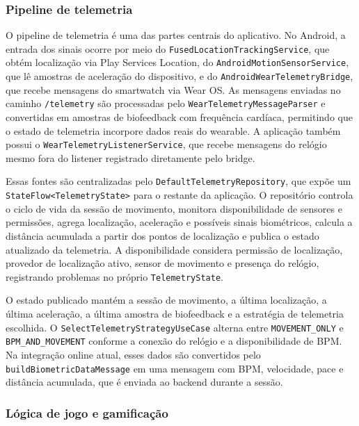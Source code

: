 \vspace{0.2cm}
\subsubsection{Pipeline de telemetria}
\vspace{0.2cm}

O pipeline de telemetria é uma das partes centrais do aplicativo. No Android, a entrada dos sinais ocorre por meio do \texttt{FusedLocationTrackingService}, que obtém localização via Play Services Location, do \texttt{AndroidMotionSensorService}, que lê amostras de aceleração do dispositivo, e do \texttt{AndroidWearTelemetryBridge}, que recebe mensagens do smartwatch via Wear OS. As mensagens enviadas no caminho \texttt{/telemetry} são processadas pelo \texttt{WearTelemetryMessageParser} e convertidas em amostras de biofeedback com frequência cardíaca, permitindo que o estado de telemetria incorpore dados reais do wearable. A aplicação também possui o \texttt{WearTelemetryListenerService}, que recebe mensagens do relógio mesmo fora do listener registrado diretamente pelo bridge.

Essas fontes são centralizadas pelo \texttt{DefaultTelemetryRepository}, que expõe um \texttt{StateFlow<TelemetryState>} para o restante da aplicação. O repositório controla o ciclo de vida da sessão de movimento, monitora disponibilidade de sensores e permissões, agrega localização, aceleração e possíveis sinais biométricos, calcula a distância acumulada a partir dos pontos de localização e publica o estado atualizado da telemetria. A disponibilidade considera permissão de localização, provedor de localização ativo, sensor de movimento e presença do relógio, registrando problemas no próprio \texttt{TelemetryState}.

O estado publicado mantém a sessão de movimento, a última localização, a última aceleração, a última amostra de biofeedback e a estratégia de telemetria escolhida. O \texttt{SelectTelemetryStrategyUseCase} alterna entre \texttt{MOVEMENT\_ONLY} e \texttt{BPM\_AND\_MOVEMENT} conforme a conexão do relógio e a disponibilidade de BPM. Na integração online atual, esses dados são convertidos pelo \texttt{buildBiometricDataMessage} em uma mensagem com BPM, velocidade, pace e distância acumulada, que é enviada ao backend durante a sessão.

\vspace{0.2cm}
\subsubsection{Lógica de jogo e gamificação}
\vspace{0.2cm}

